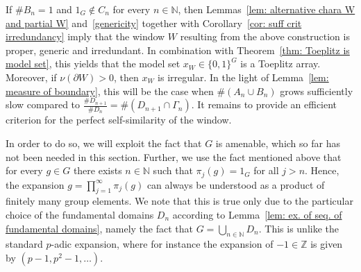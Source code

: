\documentclass[titlepage,reqno,10pt]{amsart}
\theoremstyle{definition}
\def\Z{{\mathbb Z}}
\def\N{{\mathbb N}}
\begin{document}
If $\#B_n = 1$ and $1_G \notin C_n$ for every $n \in \mathbb{N}$, then Lemmas~\ref{lem: alternative chara W and partial W} and~\ref{genericity} together with Corollary~\ref{cor: suff crit irredundancy} imply that the window $W$ resulting from the above construction is proper, generic and irredundant. In combination with Theorem~\ref{thm: Toeplitz is model set}, this yields that the model set $x_W \in \{0,1\}^G$ is a Toeplitz array. Moreover, if $\nu(\partial W)>0$, then $x_W$ is irregular. In the light of Lemma~\ref{lem: measure of boundary}, this will be the case when $\#(A_n\cup B_n)$ grows sufficiently slow compared to $\frac{\# D_{n+1}}{\#D_n}=\#(D_{n+1}\cap \Gamma_n)$. It remains to provide an efficient criterion for the perfect self-similarity of the window. 
\smallskip

In order to do so, we will exploit the fact that $G$ is amenable, which so far has not been needed in this section. 
Further, we use the fact mentioned above that for every $g\in G$ there exists $n\in\N$ such that $\pi_j(g)=1_G$ for all $j>n$. Hence, the expansion $g = \prod_{j=1}^\infty \pi_j(g)$ can always be understood as a product of finitely many group elements. We note that this is true only due to the particular choice of the fundamental domains $D_n$ according to Lemma~\ref{lem: ex. of seq. of fundamental domains}, namely the fact that $G=\bigcup_{n\in\N} D_n$. This is unlike the standard $p$-adic expansion, where for instance the expansion of $-1\in \Z$ is given by $(p-1,p^2-1,\ldots)$.
\end{document}
